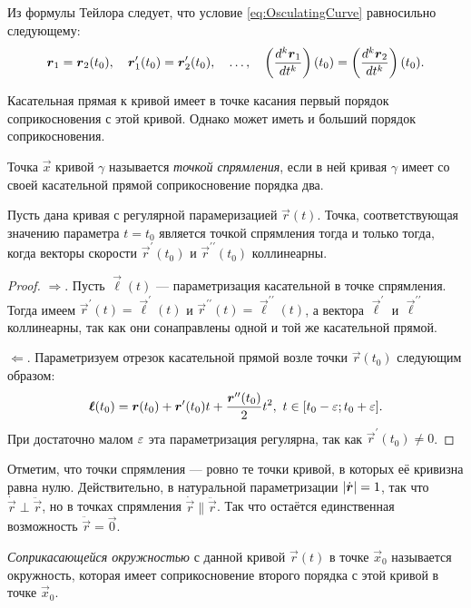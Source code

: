Из формулы Тейлора следует, что условие \eqref{eq:OsculatingCurve} равносильно следующему:
\[
	\boldsymbol{r}_1 = \boldsymbol{r}_2(t_0),\quad \boldsymbol{r}_1^\prime(t_0) = \boldsymbol{r}_2^\prime(t_0),\quad \ldots,\quad \left(\frac{d^k\boldsymbol{r}_1}{dt^k}\right)(t_0) = \left(\frac{d^k\boldsymbol{r}_2}{dt^k}\right)(t_0).
\]

Касательная прямая к кривой имеет в точке касания первый порядок соприкосновения с этой кривой. Однако может иметь и больший порядок соприкосновения.

\begin{definition}
	Точка $\vec{x}$ кривой $\gamma$ называется \textit{точкой спрямления}, если в ней кривая $\gamma$ имеет со своей касательной прямой соприкосновение порядка два.
\end{definition}

\begin{proposition} \label{proposition:Inflection}
	Пусть дана кривая с регулярной парамеризацией $\vec{r}(t)$. Точка, соответствующая значению параметра $t = t_0$ является точкой спрямления тогда и только тогда, когда векторы скорости $\vec{r}^\prime(t_0)$ и $\vec{r}^{\prime\prime}(t_0)$ коллинеарны.
\end{proposition}

\begin{proof}
	$\Rightarrow$. Пусть $\vec{\ell}(t)$ --- параметризация касательной в точке спрямления. Тогда имеем $\vec{r}^\prime(t) = \vec{\ell}^\prime(t)$ и $\vec{r}^{\prime\prime}(t) = \vec{\ell}^{\prime\prime}(t)$, а вектора $\vec{\ell}^\prime$ и $\vec{\ell}^{\prime\prime}$ коллинеарны, так как они сонаправлены одной и той же касательной прямой.

	$\Leftarrow$. Параметризуем отрезок касательной прямой возле точки $\vec{r}(t_0)$ следующим образом:
	\[
		\boldsymbol{\ell}(t_0) = \boldsymbol{r}(t_0) + \boldsymbol{r}^\prime(t_0)t + \frac{\boldsymbol{r}^{\prime\prime}(t_0)}{2}t^2,\ t \in [t_0 - \varepsilon; t_0 + \varepsilon].
	\]
	При достаточно малом $\varepsilon$ эта параметризация регулярна, так как $\vec{r}^{\prime}(t_0) \ne 0$.
\end{proof}

Отметим, что точки спрямления --- ровно те точки кривой, в которых её кривизна равна нулю. Действительно, в натуральной параметризации $\left\lvert\dot{\boldsymbol{r}}\right\rvert = 1$, так что $\dot{\vec{r}} \perp \ddot{\vec{r}}$, но в точках спрямления $\dot{\vec{r}} \parallel \ddot{\vec{r}}$. Так что остаётся единственная возможность $\ddot{\vec{r}} = \vec{0}$.

\begin{definition}
	\textit{Соприкасающейся окружностью} с данной кривой $\vec{r}(t)$ в точке $\vec{x}_0$ называется окружность, которая имеет соприкосновение второго порядка с этой кривой в точке $\vec{x}_0$.
\end{definition}

